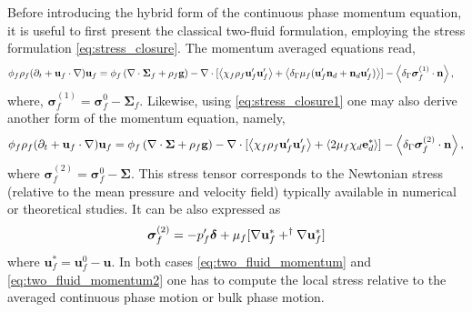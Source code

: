 Before introducing the hybrid form of the continuous phase momentum equation, it is useful to first present the classical two-fluid formulation, employing the stress formulation \ref{eq:stress_closure}.
The momentum averaged equations read, 
\begin{align}
    \phi_f \rho_f(\pddt + \textbf{u}_f  \cdot \grad) \textbf{u}_f
    &= \phi_f 
    \left(\div \bm{\Sigma}_f
    + \rho_f \textbf{g}\right)
    - \div 
    [\avg{\chi_f\rho_f \textbf{u}_f'\textbf{u}_f'}
    +\avg{\delta_\Gamma \mu_f( \textbf{u}_f'  \textbf{n}_d +  \textbf{n}_d \textbf{u}_f')}]
    - \avg{\delta_\Gamma \bm\sigma_f^{(1)}\cdot \textbf{n}},
    \label{eq:two_fluid_momentum}
\end{align}
where, $\bm\sigma_f^{(1)}=\bm\sigma_f^0 - \bm\Sigma_f$. %
Likewise, using \ref{eq:stress_closure1} one may also derive another form of the momentum equation, namely,
\begin{equation}
    \phi_f \rho_f(\pddt + \textbf{u}_f  \cdot \grad) \textbf{u}_f
    = \phi_f 
    \left(\div \bm{\Sigma}
    + \rho_f \textbf{g}\right)
    - \div 
    [\avg{\chi_f\rho_f \textbf{u}_f'\textbf{u}_f'} + \avg{2\mu_f \chi_d \textbf{e}_d^*}]
    - \avg{\delta_\Gamma \bm\sigma_f^{(2)}\cdot \textbf{n}},
    \label{eq:two_fluid_momentum2}
\end{equation} 
where $\bm\sigma_f^{(2)}=\bm\sigma_f^0 - \bm\Sigma$. 
This stress tensor corresponds to the Newtonian stress (relative to the mean pressure and velocity field) typically available in numerical or theoretical studies. 
It can be also expressed as 
\begin{equation}
    \bm\sigma_f^{(2)} 
    =
    -p_f'\bm\delta
    + \mu_f [
        \grad \textbf{u}_f^*
        + ^\dagger \grad \textbf{u}_f^*
    ]
    \label{eq:disturbance_stress}
\end{equation}
where $\textbf{u}_f^*= \textbf{u}_f^0 - \textbf{u}$.
In both cases \ref{eq:two_fluid_momentum} and \ref{eq:two_fluid_momentum2} one has to compute the local stress relative to the averaged continuous phase motion or bulk phase motion. 


